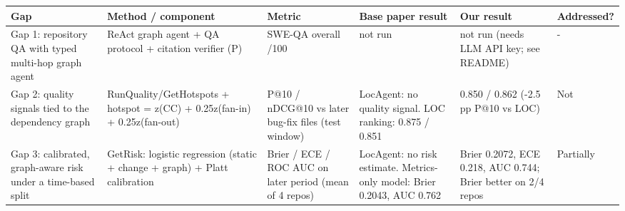 \begin{tabular}{p{1.6cm}p{2.6cm}p{2.0cm}p{2.8cm}p{3.2cm}p{1.2cm}}
\toprule
Gap & Method / component & Metric & Base paper result & Our result & Addressed? \\
\midrule
Gap 1: repository QA with typed multi-hop graph agent & ReAct graph agent + QA protocol + citation verifier (P) & SWE-QA overall /100 & not run & not run (needs LLM API key; see README) & - \\ \midrule
Gap 2: quality signals tied to the dependency graph & RunQuality/GetHotspots + hotspot = z(CC) + 0.25z(fan-in) + 0.25z(fan-out) & P@10 / nDCG@10 vs later bug-fix files (test window) & LocAgent: no quality signal. LOC ranking: 0.875 / 0.851 & 0.850 / 0.862 (-2.5 pp P@10 vs LOC) & Not \\ \midrule
Gap 3: calibrated, graph-aware risk under a time-based split & GetRisk: logistic regression (static + change + graph) + Platt calibration & Brier / ECE / ROC AUC on later period (mean of 4 repos) & LocAgent: no risk estimate. Metrics-only model: Brier 0.2043, AUC 0.762 & Brier 0.2072, ECE 0.218, AUC 0.744; Brier better on 2/4 repos & Partially \\ \midrule
\bottomrule
\end{tabular}
